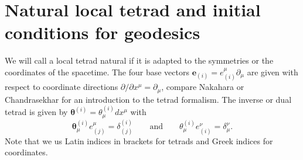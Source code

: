 \documentclass[10pt,twoside,notitlepage,a4paper,fleqn,openbib]{report}
\begin{document}
\section{Natural local tetrad and initial conditions for geodesics}\label{sec:natLocTetrad}
\setcounter{equation}{0}
We will call a local tetrad natural if it is adapted to the symmetries or the coordinates of the spacetime. The four base vectors $\mathbf{e}_{(i)}=e_{(i)}^{\mu}\partial_{\mu}$ are given with respect to coordinate directions $\partial/\partial x^{\mu}=\partial_{\mu}$, compare Nakahara\cite{nakahara} or Chandrasekhar\cite{chandrasekhar2006} for an introduction to the tetrad formalism. The inverse or dual tetrad is given by $\boldsymbol{\theta}^{(i)}=\theta^{(i)}_{\mu}dx^{\mu}$ with
\begin{equation}
  \boldsymbol{\theta}^{(i)}_{\mu}e_{(j)}^{\mu} = \delta_{(j)}^{(i)}\qquad\text{and}\qquad \theta^{(i)}_{\mu}e_{(i)}^{\nu} = \delta_{\mu}^{\nu}.
\end{equation}
Note that we us Latin indices in brackets for tetrads and Greek indices for coordinates.
\end{document}
